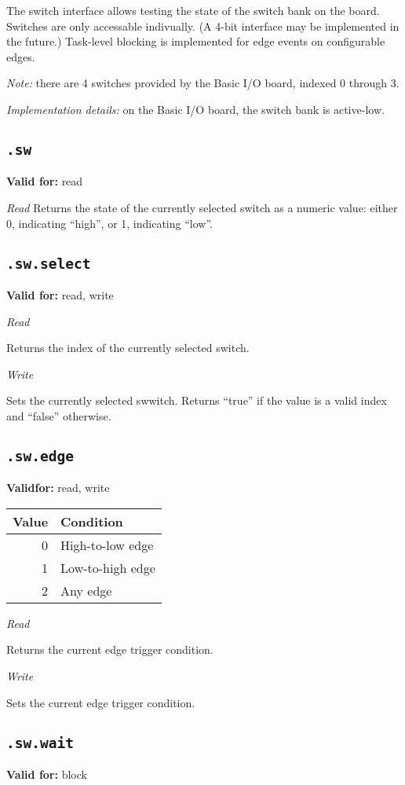 \documentclass{article}
\begin{document}
The switch interface allows testing the state of the switch bank on the board. Switches are only accessable indivually. (A 4-bit interface may be implemented in the future.)
Task-level blocking is implemented for edge events on configurable edges.

\textit{Note:} there are 4 switches provided by the Basic I/O board, indexed 0 through 3.

\textit{Implementation details:} on the Basic I/O board, the switch bank is active-low.

\subsection{\texttt{.sw}}
\textbf{Valid for:} read

\textit{Read}
Returns the state of the currently selected switch as a numeric value: either 0, indicating ``high'', or 1, indicating ``low''.

\subsection{\texttt{.sw.select}}
\textbf{Valid for:} read, write

\textit{Read}

Returns the index of the currently selected switch.

\textit{Write}

Sets the currently selected swwitch. Returns ``true'' if the value is a valid index and ``false'' otherwise.

\subsection{\texttt{.sw.edge}}
\textbf{Validfor:} read, write

\begin{tabular}{rl}
Value & Condition \\ \hline
0 & High-to-low edge \\
1 & Low-to-high edge \\
2 & Any edge \\
\end{tabular}

\textit{Read}

Returns the current edge trigger condition.

\textit{Write}

Sets the current edge trigger condition.

\subsection{\texttt{.sw.wait}}
\textbf{Valid for:} block
\end{document}
